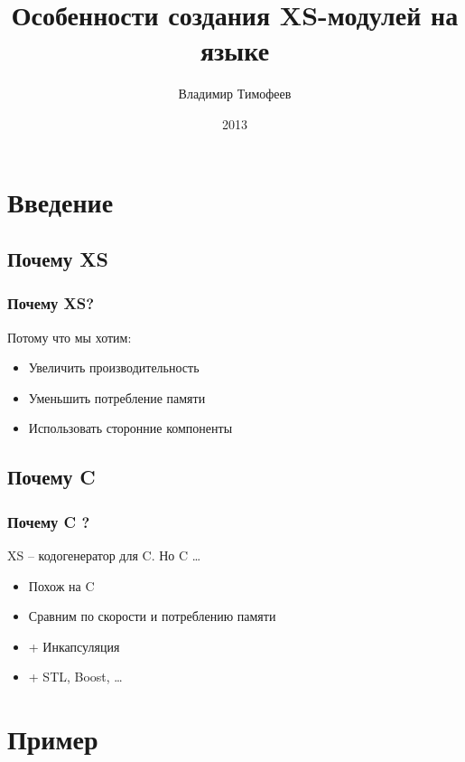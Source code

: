 \documentclass[pdflatex,hyperref={unicode=true}]{beamer}
\title{Особенности создания XS-модулей на языке \cpp}
\author{Владимир Тимофеев}
\date{2013}
\DeclareRobustCommand{\cpp}{
    \texorpdfstring{\hbox{C\hspace{-0.5ex}\protect\raisebox{0.5ex}{\protect\scalebox{0.67}{++}}}}{C++}
}
\begin{document}
\frame{\titlepage}

\frame{\tableofcontents[hideallsubsections]}

\section{Введение}


\subsection{Почему XS}

\begin{frame}[t]
    \frametitle{Почему XS?}
    Потому что мы хотим:
    \begin{itemize}[<+->]
        \item Увеличить производительность
        \item Уменьшить потребление памяти
        \item Использовать сторонние компоненты
    \end{itemize}
\end{frame}

\subsection{Почему \cpp}

\begin{frame}[t]
    \frametitle{Почему \cpp?}
    XS -- кодогенератор для C. Но \cpp\ldots
    \begin{itemize}[<+->]
        \item Похож на C
        \item Сравним по скорости и потреблению памяти
        \item + Инкапсуляция
        \item + STL, Boost, \dots
    \end{itemize}
\end{frame}

\section{Пример}
\end{document}
